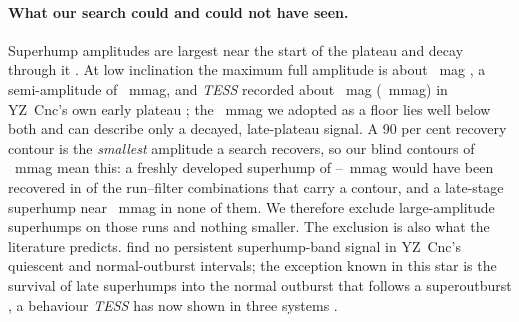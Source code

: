\paragraph{What our search could and could not have seen.}
Superhump amplitudes are largest near the start of the plateau and decay
through it \citep{smak2010, kato2012}.  At low inclination the maximum full
amplitude is about \LitShAmpMaxMag{}~mag \citep{smak2010, kato2012}, a
semi-amplitude of \LitShSemiPeakMmag{}~mmag, and \emph{TESS} recorded about
\LitYzShAmpTessMag{}~mag (\LitYzShSemiTessMmag{}~mmag) in YZ~Cnc's own
early plateau \citep{dai2026}; the \NumSuperhumpFloorMmag{}~mmag we adopted
as a floor lies well below both and can describe only a decayed,
late-plateau signal.  A 90 per cent
recovery contour is the \emph{smallest} amplitude a search recovers, so our
blind contours of \NumBlindContourRangeMmag{}~mmag mean this: a freshly
developed superhump of \LitShSemiPeakMmag--\LitYzShSemiTessMmag{}~mmag
would have been recovered in
of the \NumBlindContourRunFilters{} run--filter combinations that carry a
contour, and a late-stage superhump near \NumSuperhumpFloorMmag{}~mmag in
none of them.  We therefore exclude large-amplitude superhumps on those
runs and nothing smaller.  The exclusion is also what the literature
predicts.  \citet{dai2026} find no persistent superhump-band signal in
YZ~Cnc's quiescent and normal-outburst intervals; the exception known in
this star is the survival of late superhumps into the normal outburst that
follows a superoutburst \citep{kato2014v}, a behaviour \emph{TESS} has now
shown in three systems \citep{sun2026}.

